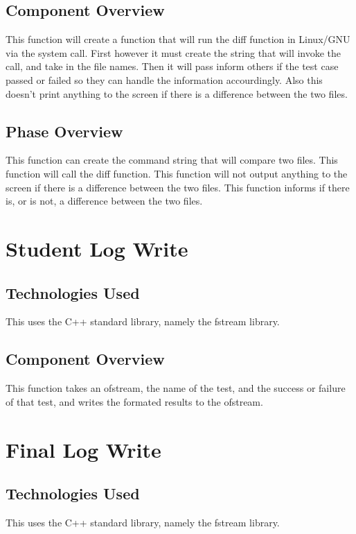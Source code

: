 \subsection{Component  Overview}
This function will create a function that will run the diff function in Linux/GNU via the system call.
First however it must create the string that will invoke the call, and take in the file names. Then it 
will pass inform others if the test case passed or failed so they can handle the information accourdingly. 
Also this doesn't print anything to the screen if there is a difference between the two files.

\subsection{Phase Overview}
This function can create the command string that will compare two files. This function will call the diff 
function. This function will not output anything to the screen if there is a difference between the two files. 
This function informs if there is, or is not, a difference between the two files.


\section {Student Log Write}

\subsection {Technologies Used}
This uses the C++ standard library, namely the fstream library.

\subsection {Component Overview}
This function takes an ofstream, the name of the test, and the success or failure of that test, and writes the
formated results to the ofstream.


\section {Final Log Write}

\subsection {Technologies Used}
This uses the C++ standard library, namely the fstream library.

